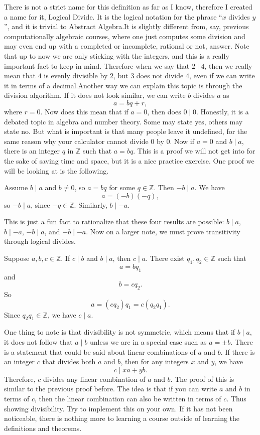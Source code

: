 There is not a strict name for this definition as far as I know, therefore I created a name for it, Logical Divide.
It is the logical notation for the phrase ``$x$ divides $y$'', and it is trivial to Abstract Algebra.It is slightly different from, say, previous computationally algebraic courses, where one just computes some division and may even end up with a completed or incomplete, rational or not, answer.
Note that up to now we are only sticking with the integers, and this is a really important fact to keep in mind.
Therefore when we say that $2\mid 4$, then we really mean that $4$ is evenly divisible by $2$, but $3$ does not divide $4$, even if we can write it in terms of a decimal.Another way we can explain this topic is through the division algorithm.
If it does not look similar, we can write $b$ divides $a$ as
\[
    a = bq + r,
\]
where $r = 0$.
Now does this mean that if $a = 0$, then does $0\mid 0$.
Honestly, it is a debated topic in algebra and number theory.
Some may state yes, others may state no.
But what is important is that many people leave it undefined, for the same reason why your calculator cannot divide $0$ by $0$.
Now if $a = 0$ and $b\mid a$, there is an integer $q$ in $\mathbb{Z}$ such that $a = bq$.
This is a proof we will not get into for the sake of saving time and space, but it is a nice practice exercise.
One proof we will be looking at is the following.

\begin{lemma}{
    Assume $b\mid a$ and $b\neq 0$, so $a=bq$ for some $q\in\mathbb{Z}$.
    Then $-b\mid a$.
}
    We have
    \[
        a = (-b)(-q),
    \]
    so $-b\mid a$, since $-q\in\mathbb{Z}$.
    Similarly, $b\mid -a$.
\end{lemma}This is just a fun fact to rationalize that these four results are possible:
$b\mid a$, $b\mid -a$, $-b\mid a$, and $-b\mid -a$.
Now on a larger note, we must prove transitivity through logical divides.

\begin{lemma}{
    Suppose $a,b,c\in\mathbb{Z}$.
    If $c\mid b$ and $b\mid a$, then $c\mid a$.
}
    There exist $q_1,q_2\in\mathbb{Z}$ such that
    \[
        a = bq_1
    \]
    and
    \[
        b = cq_2.
    \]
    So
    \[
        a = (cq_2)q_1 = c(q_{2}q_1).
    \]
    Since $q_{2}q_1\in\mathbb{Z}$, we have $c\mid a$.
\end{lemma}

One thing to note is that divisibility is not symmetric, which means that if $b\mid a$, it does not follow that $a\mid b$ unless we are in a special case such as $a = \pm b$.
There is a statement that could be said about linear combinations of $a$ and $b$.
If there is an integer $c$ that divides both $a$ and $b$, then for any integers $x$ and $y$, we have
\[
    c\mid xa+yb.
\]
Therefore, $c$ divides any linear combination of $a$ and $b$.
The proof of this is similar to the previous proof before.
The idea is that if you can write $a$ and $b$ in terms of $c$, then the linear combination can also be written in terms of $c$.
Thus showing divisibility.
Try to implement this on your own.
If it has not been noticeable, there is nothing more to learning a course outside of learning the definitions and theorems.

